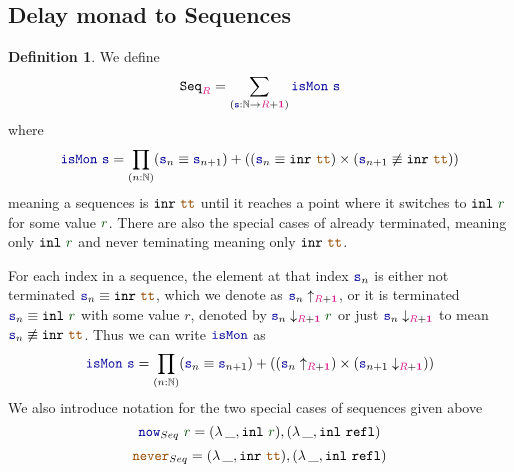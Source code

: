\documentclass[twoside,11pt,openright]{report}
\theoremstyle{plain} %
\theoremstyle{definition}
\newtheorem{defn}{Definition}[section]
\theoremstyle{remark}
\newcommand*{\term}[1]{\textcolor{green!30!black}{#1}} %
\newcommand*{\type}[1]{\textcolor{magenta!90!black}{#1}}
\newcommand*{\unit}{\type{\textbf{1}}}
\newcommand*{\constant}[1]{\textcolor{orange!60!black}{\ensuremath{\mathtt{#1}}}}
\newcommand*{\function}[1]{\textcolor{blue!60!black}{\ensuremath{\mathtt{#1}}}}
\newcommand*{\typeformer}[1]{\ensuremath{\mathtt{#1}}}
\begin{document}
\subsection{Delay monad to Sequences}
\begin{defn}
  We define
  \begin{equation}
    \typeformer{Seq}_{\type{R}} = \sum_{(\function{s} : \mathbb{N} \rightarrow \type{R} + \unit)} \function{isMon}~\function{s}
  \end{equation}
  where
  \begin{equation}
    \function{isMon}~\function{s} = \prod_{(n : \mathbb{N})} (\function{s}_n \equiv \function{s}_{n+1})  + ((\function{s}_n \equiv \mathtt{inr}~\constant{tt}) \times (\function{s}_{n+1} \not\equiv \mathtt{inr}~\constant{tt}))
  \end{equation}
  meaning a sequences is \(\mathtt{inr}~\constant{tt}\) until it reaches a point where it switches to \(\mathtt{inl}~\term{r}\) for some value \(\term{r}\). There are also the special cases of already terminated, meaning only \(\mathtt{inl}~\term{r}\) and never teminating meaning only \(\mathtt{inr}~\constant{tt}\).
\end{defn}
\noindent For each index in a sequence, the element at that index \(\function{s}_n\) is either not terminated \(\function{s}_n \equiv \mathtt{inr}~\constant{tt}\), which we denote as \(\function{s}_n \uparrow_{\type{R} + \unit}\), or it is terminated \(\function{s}_n \equiv \mathtt{inl}~\term{r}\) with some value \(r\), denoted by \(\function{s}_n \downarrow_{\type{R} + \unit} \term{r}\) or just \(\function{s}_n \downarrow_{\type{R} + \unit}\) to mean \(\function{s}_n \not\equiv \mathtt{inr}~\constant{tt}\). Thus we can write \(\function{isMon}\) as
\begin{equation}
  \function{isMon}~\function{s} = \prod_{(n : \mathbb{N})} (\function{s}_n \equiv \function{s}_{n+1})  + ((\function{s}_n \uparrow_{\type{R} + \unit}) \times (\function{s}_{n+1} \downarrow_{\type{R} + \unit}))
\end{equation}
We also introduce notation for the two special cases of sequences given above
\begin{equation}
  \function{now}_{Seq}~\term{r} = (\lambda\,\_, \mathtt{inl}~\term{r}) , (\lambda\,\_, \mathtt{inl}~\mathtt{refl})
\end{equation}
\begin{equation}
  \constant{never}_{Seq} = (\lambda\,\_, \mathtt{inr}~\constant{tt}) , (\lambda\,\_, \mathtt{inl}~\mathtt{refl})
\end{equation}
\end{document}
